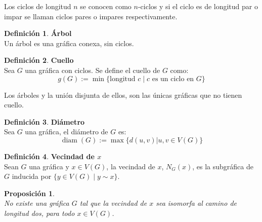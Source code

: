 \documentclass[12pt]{book}
\newtheorem{proposition}{Proposición}
\theoremstyle{definition}
\newtheorem{definition}{Definición}
\DeclareMathOperator{\diam}{diam}
\begin{document}
Los ciclos de longitud $n$ se conocen como $n$-ciclos y si el ciclo es
de longitud par o impar se llaman ciclos pares o impares
respectivamente.

\begin{definition}\textbf{Árbol}\\
  Un árbol es una gráfica conexa, sin ciclos.
\end{definition}

\begin{definition}\textbf{Cuello}\\
  Sea $G$ una gráfica con ciclos. Se define el cuello de $G$ como:
  \begin{equation*}
    g(G):= \min\{ \text{longitud $c$} \mid  \text{$c$ es un ciclo en $G$} \}
  \end{equation*}
\end{definition}

Los árboles y la unión disjunta de ellos, son las únicas gráficas
que no tienen cuello.

\begin{definition}\textbf{Diámetro}\\
  Sea $G$ una gráfica, el diámetro de $G$ es:
  \begin{equation*}
    \diam(G):=\max\{ d(u,v) | u,v \in V(G)\}
  \end{equation*}
\end{definition}

\begin{definition}\textbf{Vecindad de $x$}\\
  Sean $G$ una gráfica y $x\in V(G)$, la vecindad de $x$,
  $N_G(x)$, es la subgráfica de $G$ inducida por
  $\{y\in V(G) \mid y\sim x\}$.
\end{definition}

\begin{proposition}\textbf{}\\
  No existe una gráfica $G$ tal que la vecindad de $x$ sea isomorfa al camino de longitud dos, para todo $ x\in  V(G)$.
\end{proposition}
\end{document}
